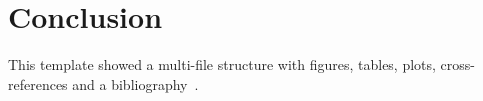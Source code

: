 \chapter{Conclusion}
\label{ch:conclusion}

This template showed a multi-file structure with figures, tables, plots,
cross-references and a bibliography~\cite{tantau2023}.
